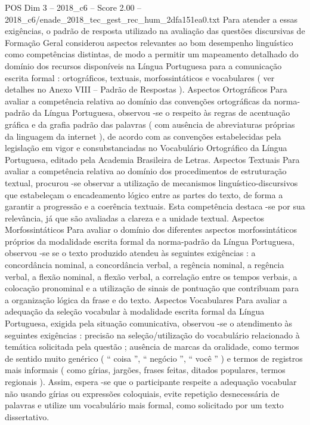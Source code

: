 \begin{textsample}{POS Dim 3 – 2018\_c6 – Score 2.00 – 2018\_c6/enade\_2018\_tec\_gest\_rec\_hum\_2dfa151ea0.txt}
Para atender a essas exigências, o padrão de resposta utilizado na avaliação das questões discursivas de Formação Geral considerou aspectos relevantes ao bom desempenho linguístico como competências distintas, de modo a permitir um mapeamento detalhado do domínio dos recursos disponíveis na Língua Portuguesa para a comunicação escrita formal : ortográficos, textuais, morfossintáticos e vocabulares ( ver detalhes no Anexo VIII – Padrão de Respostas ).
Aspectos Ortográficos Para avaliar a competência relativa ao domínio das convenções ortográficas da norma-padrão da Língua Portuguesa, observou -se o respeito às regras de acentuação gráfica e da grafia padrão das palavras ( com ausência de abreviaturas próprias da linguagem da internet ), de acordo com as convenções estabelecidas pela legislação em vigor e consubstanciadas no Vocabulário Ortográfico da Língua Portuguesa, editado pela Academia Brasileira de Letras.
Aspectos Textuais Para avaliar a competência relativa ao domínio dos procedimentos de estruturação textual, procurou -se observar a utilização de mecanismos linguístico-discursivos que estabeleçam o encadeamento lógico entre as partes do texto, de forma a garantir a progressão e a coerência textuais.
Esta competência destaca -se por sua relevância, já que são avaliadas a clareza e a unidade textual.
Aspectos Morfossintáticos Para avaliar o domínio dos diferentes aspectos morfossintáticos próprios da modalidade escrita formal da norma-padrão da Língua Portuguesa, observou -se se o texto produzido atendeu às seguintes exigências : a concordância nominal, a concordância verbal, a regência nominal, a regência verbal, a flexão nominal, a flexão verbal, a correlação entre os tempos verbais, a colocação pronominal e a utilização de sinais de pontuação que contribuam para a organização lógica da frase e do texto.
Aspectos Vocabulares Para avaliar a adequação da seleção vocabular à modalidade escrita formal da Língua Portuguesa, exigida pela situação comunicativa, observou -se o atendimento às seguintes exigências : precisão na seleção/utilização do vocabulário relacionado à temática solicitada pela questão ; ausência de marcas da oralidade, como termos de sentido muito genérico ( “ coisa ”, “ negócio ”, “ você ” ) e termos de registros mais informais ( como gírias, jargões, frases feitas, ditados populares, termos regionais ).
Assim, espera -se que o participante respeite a adequação vocabular não usando gírias ou expressões coloquiais, evite repetição desnecessária de palavras e utilize um vocabulário mais formal, como solicitado por um texto dissertativo.

\end{textsample}
